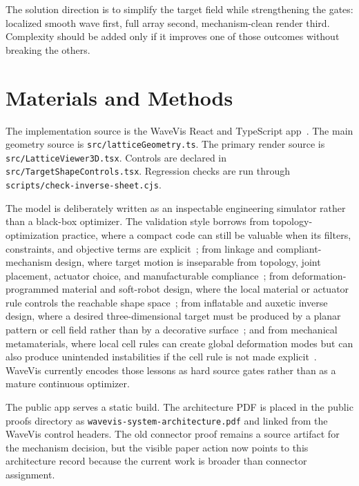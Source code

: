 \documentclass[12pt,letterpaper]{article}
\newcommand{\code}[1]{\texttt{#1}}
\begin{document}
The solution direction is to simplify the target field while strengthening the gates: localized smooth wave first, full array second, mechanism-clean render third. Complexity should be added only if it improves one of those outcomes without breaking the others.

\section{Materials and Methods}

The implementation source is the WaveVis React and TypeScript app~\cite{wavevis_source_2026}. The main geometry source is \code{src/latticeGeometry.ts}. The primary render source is \code{src/LatticeViewer3D.tsx}. Controls are declared in \code{src/TargetShapeControls.tsx}. Regression checks are run through \code{scripts/check-inverse-sheet.cjs}.

The model is deliberately written as an inspectable engineering simulator rather than a black-box optimizer. The validation style borrows from topology-optimization practice, where a compact code can still be valuable when its filters, constraints, and objective terms are explicit~\cite{sigmund_99line_2001,sigmund_maute_2013}; from linkage and compliant-mechanism design, where target motion is inseparable from topology, joint placement, actuator choice, and manufacturable compliance~\cite{coros_mechanical_characters_2013,thomaszewski_linkage_characters_2014,megaro_compliant_mechanisms_2017,sigmund_compliant_1997}; from deformation-programmed material and soft-robot design, where the local material or actuator rule controls the reachable shape space~\cite{bickel_deformation_materials_2010,rus_tolley_soft_robots_2015}; from inflatable and auxetic inverse design, where a desired three-dimensional target must be produced by a planar pattern or cell field rather than by a decorative surface~\cite{skouras_designing_inflatable_2014,konakovic_auxetic_2016,panetta_surface_inflatables_2021}; and from mechanical metamaterials, where local cell rules can create global deformation modes but can also produce unintended instabilities if the cell rule is not made explicit~\cite{bertoldi_instability_2010,coulais_textured_2016,kadic_3d_metamaterials_2019}. WaveVis currently encodes those lessons as hard source gates rather than as a mature continuous optimizer.

The public app serves a static build. The architecture PDF is placed in the public proofs directory as \code{wavevis-system-architecture.pdf} and linked from the WaveVis control headers. The old connector proof remains a source artifact for the mechanism decision, but the visible paper action now points to this architecture record because the current work is broader than connector assignment.
\end{document}
